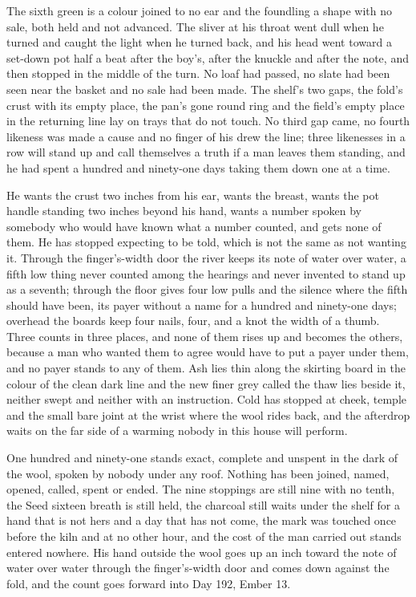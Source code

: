 The sixth green is a colour joined to no ear and the foundling a shape with no sale, both held and not advanced. The sliver at his throat went dull when he turned and caught the light when he turned back, and his head went toward a set-down pot half a beat after the boy's, after the knuckle and after the note, and then stopped in the middle of the turn. No loaf had passed, no slate had been seen near the basket and no sale had been made. The shelf's two gaps, the fold's crust with its empty place, the pan's gone round ring and the field's empty place in the returning line lay on trays that do not touch. No third gap came, no fourth likeness was made a cause and no finger of his drew the line; three likenesses in a row will stand up and call themselves a truth if a man leaves them standing, and he had spent a hundred and ninety-one days taking them down one at a time.

He wants the crust two inches from his ear, wants the breast, wants the pot handle standing two inches beyond his hand, wants a number spoken by somebody who would have known what a number counted, and gets none of them. He has stopped expecting to be told, which is not the same as not wanting it. Through the finger's-width door the river keeps its note of water over water, a fifth low thing never counted among the hearings and never invented to stand up as a seventh; through the floor  gives four low pulls and the silence where the fifth should have been, its payer without a name for a hundred and ninety-one days; overhead the boards keep four nails, four, and a knot the width of a thumb. Three counts in three places, and none of them rises up and becomes the others, because a man who wanted them to agree would have to put a payer under them, and no payer stands to any of them. Ash lies thin along the skirting board in the colour of the clean dark line and the new finer grey called the thaw lies beside it, neither swept and neither with an instruction. Cold has stopped at cheek, temple and the small bare joint at the wrist where the wool rides back, and the afterdrop waits on the far side of a warming nobody in this house will perform.

One hundred and ninety-one stands exact, complete and unspent in the dark of the wool, spoken by nobody under any roof. Nothing has been joined, named, opened, called, spent or ended. The nine stoppings are still nine with no tenth, the Seed sixteen breath is still held, the charcoal still waits under the shelf for a hand that is not hers and a day that has not come, the mark was touched once before the kiln and at no other hour, and the cost of the man carried out stands entered nowhere. His hand outside the wool goes up an inch toward the note of water over water through the finger's-width door and comes down against the fold, and the count goes forward into Day 192, Ember 13.
